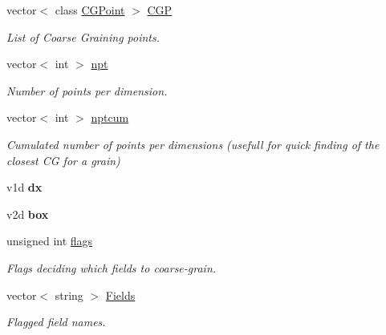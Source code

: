 \begin{DoxyCompactItemize}
\mbox{\label{classCoarsing_a17b179f56085f3f9a172e4591fc21a2b}} 
vector$<$ class \hyperlink{classCGPoint}{C\+G\+Point} $>$ \hyperlink{classCoarsing_a17b179f56085f3f9a172e4591fc21a2b}{C\+GP}
\begin{DoxyCompactList}\small\item\em List of Coarse Graining points. \end{DoxyCompactList}\item 
\mbox{\label{classCoarsing_adb12a0d3e3ae6634cf8801555f0afedd}} 
vector$<$ int $>$ \hyperlink{classCoarsing_adb12a0d3e3ae6634cf8801555f0afedd}{npt}
\begin{DoxyCompactList}\small\item\em Number of points per dimension. \end{DoxyCompactList}\item 
\mbox{\label{classCoarsing_ad50b41450dd51c366ecb4fd1ec07e03d}} 
vector$<$ int $>$ \hyperlink{classCoarsing_ad50b41450dd51c366ecb4fd1ec07e03d}{nptcum}
\begin{DoxyCompactList}\small\item\em Cumulated number of points per dimensions (usefull for quick finding of the closest CG for a grain) \end{DoxyCompactList}\item 
\mbox{\label{classCoarsing_abf3938c073fe57b4515bd54897c77d69}} 
v1d {\bfseries dx}
\item 
\mbox{\label{classCoarsing_a693207f9b72e42b89e1d68b9a6259fa6}} 
v2d {\bfseries box}
\item 
\mbox{\label{classCoarsing_a71f3970db217286403591f34bd51c2da}} 
unsigned int \hyperlink{classCoarsing_a71f3970db217286403591f34bd51c2da}{flags}
\begin{DoxyCompactList}\small\item\em Flags deciding which fields to coarse-\/grain. \end{DoxyCompactList}\item 
\mbox{\label{classCoarsing_aa2fe878237d61cfea5421bd433e1210d}} 
vector$<$ string $>$ \hyperlink{classCoarsing_aa2fe878237d61cfea5421bd433e1210d}{Fields}
\begin{DoxyCompactList}\small\item\em Flagged field names. \end{DoxyCompactList}\item 

\end{DoxyCompactItemize}
